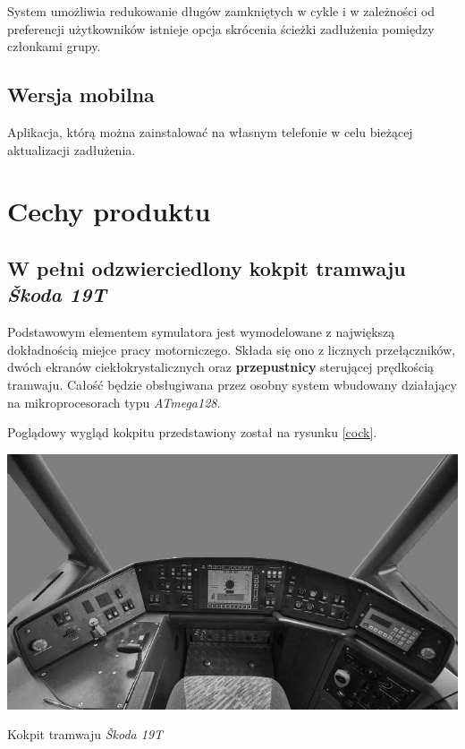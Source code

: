 \documentclass[12pt,a4paper]{article}
\begin{document}
System umożliwia redukowanie długów zamkniętych w cykle i w zależności od preferencji użytkowników istnieje opcja skrócenia ścieżki zadłużenia pomiędzy członkami grupy.

	\subsection{Wersja mobilna}

Aplikacja, którą można zainstalować na własnym telefonie w celu bieżącej aktualizacji zadłużenia.

\newpage

\section{Cechy produktu}
\subsection{W pełni odzwierciedlony kokpit tramwaju \textit{Škoda 19T}}
Podstawowym elementem symulatora jest wymodelowane z największą dokładnością miejce pracy motorniczego. Składa się ono z licznych przełączników, dwóch ekranów ciekłokrystalicznych oraz \textbf{przepustnicy} sterującej prędkością tramwaju. Całość będzie obsługiwana
przez osobny system wbudowany działający na mikroprocesorach typu \textit{ATmega128}.

Poglądowy wygląd kokpitu przedstawiony został na rysunku \ref{cock}.

\begin{image}
	\begin{center}
		\includegraphics[bb=0 0 700px 396px]{img/cockBW.jpg}
		\caption{Kokpit tramwaju {\it Škoda 19T}}
			\label{cock}
	\end{center}
\end{image}
\end{document}
